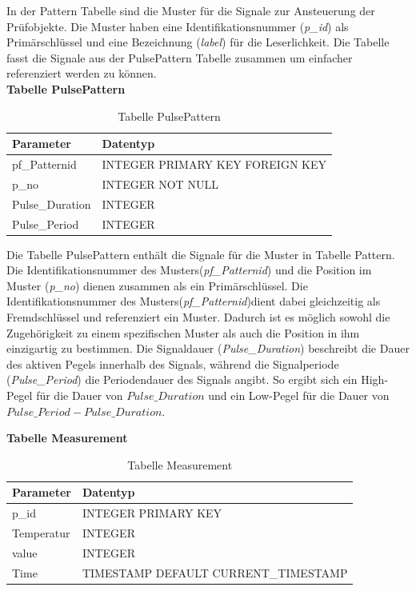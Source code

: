In der Pattern Tabelle sind die Muster für die Signale zur Ansteuerung der Prüfobjekte. Die Muster haben eine Identifikationsnummer (\textit{p\_id}) als Primärschlüssel und eine Bezeichnung (\textit{label}) für die Leserlichkeit. Die Tabelle fasst die Signale aus der PulsePattern Tabelle zusammen um einfacher referenziert werden zu können.\\

\textbf{Tabelle PulsePattern}\\

\begin{table}[H]
\begin{center}
\begin{tabular}{|l|l|}\hline
Parameter & Datentyp \\ \hline
pf\_Patternid & INTEGER PRIMARY KEY FOREIGN KEY\\ 
p\_no & INTEGER NOT NULL\\
Pulse\_Duration & INTEGER\\
Pulse\_Period & INTEGER\\ \hline
\end{tabular}
\caption{Tabelle PulsePattern}
\label{table_TabellePulsePattern}
\end{center}
\end{table}

Die Tabelle PulsePattern enthält die Signale für die Muster in Tabelle Pattern. Die Identifikationsnummer des Musters(\textit{pf\_Patternid}) und die Position im Muster (\textit{p\_no}) dienen zusammen als ein Primärschlüssel. Die Identifikationsnummer des Musters(\textit{pf\_Patternid})dient dabei gleichzeitig als Fremdschlüssel und referenziert ein Muster. Dadurch ist es möglich sowohl die Zugehörigkeit zu einem spezifischen Muster als auch die Position in ihm einzigartig zu bestimmen. Die Signaldauer (\textit{Pulse\_Duration}) beschreibt die Dauer des aktiven Pegels innerhalb des Signals, während die Signalperiode (\textit{Pulse\_Period}) die Periodendauer des Signals angibt. So ergibt sich ein High-Pegel für die Dauer von $Pulse\_Duration$ und ein Low-Pegel für die Dauer von $Pulse\_Period - Pulse\_Duration$.\\

\newpage

\textbf{Tabelle Measurement}\\

\begin{table}[H]
\begin{center}
\begin{tabular}{|l|l|}\hline
Parameter & Datentyp \\ \hline
p\_id & INTEGER PRIMARY KEY \\ 
Temperatur & INTEGER\\
value & INTEGER\\
Time & TIMESTAMP DEFAULT CURRENT\_TIMESTAMP\\ \hline
\end{tabular}
\caption{Tabelle Measurement}
\label{table_TabelleMeasurement}
\end{center}
\end{table}

